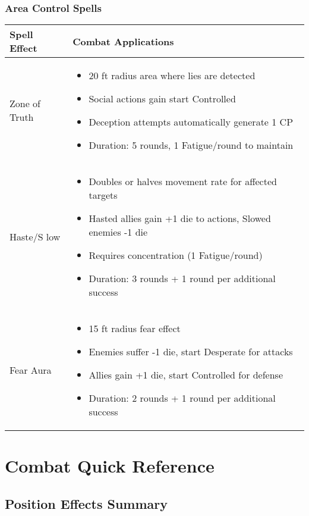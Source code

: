 \subsubsection{Area Control Spells}

\begin{longtable}{|>{\raggedright\arraybackslash}p{4cm}|>{\raggedright\arraybackslash}p{8cm}|}
\hline
\textbf{Spell Effect} & \textbf{Combat Applications} \\
\hline
Zone of Truth & 
\begin{itemize}
    \item 20 ft radius area where lies are detected
    \item Social actions gain start Controlled
    \item Deception attempts automatically generate 1 CP
    \item Duration: 5 rounds, 1 Fatigue/round to maintain
\end{itemize} \\
\hline
Haste/S low & 
\begin{itemize}
    \item Doubles or halves movement rate for affected targets
    \item Hasted allies gain +1 die to actions, Slowed enemies -1 die
    \item Requires concentration (1 Fatigue/round)
    \item Duration: 3 rounds + 1 round per additional success
\end{itemize} \\
\hline
Fear Aura & 
\begin{itemize}
    \item 15 ft radius fear effect
    \item Enemies suffer -1 die, start Desperate for attacks
    \item Allies gain +1 die, start Controlled for defense
    \item Duration: 2 rounds + 1 round per additional success
\end{itemize} \\
\hline
\end{longtable}

\newpage

\section{Combat Quick Reference}

\subsection{Position Effects Summary}

